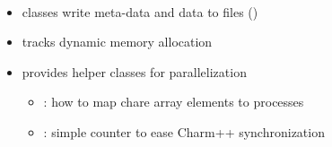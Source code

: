 
\begin{frame}[fragile] 
\secframetitle{\ssComponents}
\framesubtitle{}

\begin{itemize}
\item {} classes write meta-data and data to files ()
\item {} tracks dynamic memory allocation
\item {} provides helper classes for parallelization
\begin{itemize}
\item {}: how to map chare array elements to processes
\item {}: simple counter to ease Charm++ synchronization
\end{itemize}
\end{itemize}
\end{frame}



